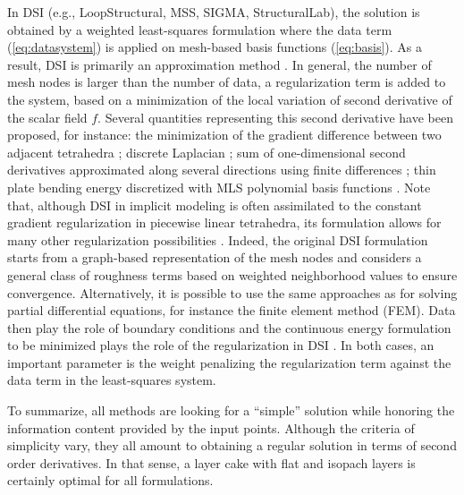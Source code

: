 \documentclass[preprint]{ring20}
\begin{document}
In DSI (e.g., LoopStructural, MSS, SIGMA, StructuralLab), the solution is obtained by a weighted least-squares formulation where the data term (\ref{eq:datasystem}) is applied on mesh-based basis functions (\ref{eq:basis}). As a result, DSI is primarily an approximation method \citep[but exact interpolation can be obtained if required by including the points in the mesh and constraining the target values, ][]{Mallet1992CD}. 
In general, the number of mesh nodes is larger than the number of data, a regularization term is added to the system, based on a minimization of the local variation of second derivative of the scalar field $f$. Several quantities representing this second derivative have been proposed, for instance: 
the minimization of the gradient difference between two adjacent tetrahedra \citep{Frank2007CG}; 
discrete Laplacian \citep{Irakarama2021MG,Irakarama2022CD}; 
sum of one-dimensional second derivatives approximated along several directions using finite differences \citep{Irakarama2021MG}; 
thin plate bending energy discretized with MLS polynomial basis functions \citep{Renaudeau2019MG}. 
Note that, although DSI in implicit modeling is often assimilated to the constant gradient regularization in piecewise linear tetrahedra, its formulation allows for many other regularization possibilities \citep{Mallet1992CD}. Indeed, the original DSI formulation starts from a graph-based representation of the mesh nodes and considers a general class of roughness terms based on weighted neighborhood values to ensure convergence. 
Alternatively, it is possible to use the same approaches as for solving partial differential equations, for instance the finite element method (FEM). Data then play the role of boundary conditions and the continuous energy formulation to be minimized plays the role of the regularization in DSI \citep{Renaudeau2019MG}. In both cases, an important parameter is the weight penalizing the regularization term against the data term in the least-squares system. 

To summarize, all methods are looking for a ``simple'' solution while honoring the information content provided by the input points. Although the criteria of simplicity vary, they all amount to obtaining a regular solution in terms of second order derivatives. In that sense, a layer cake with flat and isopach layers is certainly optimal for all formulations. 
\end{document}
